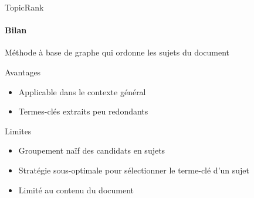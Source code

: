 %
%

\begin{frame}{TopicRank}\framesubtitle{Bilan}
  Méthode à base de graphe qui ordonne les sujets du document

  \vspace{1em}

  \begin{block}{Avantages}
    \begin{itemize}
      \item{Applicable dans le contexte général}
      \item{Termes-clés extraits peu redondants}
    \end{itemize}
  \end{block}

  \vspace{1em}

  \begin{alertblock}{Limites}
    \begin{itemize}
      \item{Groupement naïf des candidats en sujets}
      \item{Stratégie sous-optimale pour sélectionner le terme-clé d'un sujet}
      \item{Limité au contenu du document}
    \end{itemize}
  \end{alertblock}
\end{frame}

